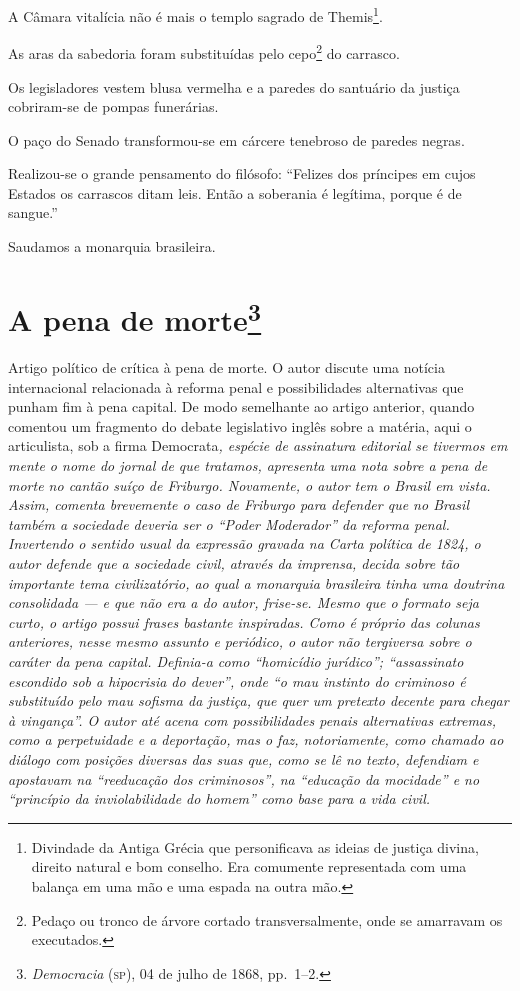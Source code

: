 A Câmara vitalícia não é mais o templo sagrado de Themis\footnote{
  Divindade da Antiga Grécia que personificava as ideias de justiça
  divina, direito natural e bom conselho. Era comumente representada com
  uma balança em uma mão e uma espada na outra mão.}.

As aras da sabedoria foram substituídas pelo cepo\footnote{Pedaço ou
  tronco de árvore cortado transversalmente, onde se amarravam os
  executados.} do carrasco.

Os legisladores vestem blusa vermelha e a paredes do santuário da
justiça cobriram-se de pompas funerárias.

O paço do Senado transformou-se em cárcere tenebroso de paredes negras.

Realizou-se o grande pensamento do filósofo: ``Felizes dos príncipes em
cujos Estados os carrascos ditam leis. Então a soberania é legítima,
porque é de sangue.''

Saudamos a monarquia brasileira.

\chapter{A pena de morte\footnote{\emph{Democracia} (\textsc{sp}), 04 de julho de 1868, pp.~1--2.}}

\begin{didascalia}
Artigo político de crítica à pena de morte. O autor discute uma notícia
internacional relacionada à reforma penal e possibilidades alternativas
que punham fim à pena capital. De modo semelhante ao artigo anterior,
quando comentou um fragmento do debate legislativo inglês sobre a
matéria, aqui o articulista, sob a firma Democrata\emph{, espécie de
assinatura editorial se tivermos em mente o nome do jornal de que
tratamos, apresenta uma nota sobre a pena de morte no cantão suíço de
Friburgo. Novamente, o autor tem o Brasil em vista. Assim, comenta
brevemente o caso de Friburgo para defender que no Brasil também a
sociedade deveria ser o ``Poder Moderador'' da reforma penal. Invertendo o
sentido usual da expressão gravada na Carta política de 1824, o autor
defende que a sociedade civil, através da imprensa, decida sobre tão
importante tema civilizatório, ao qual a monarquia brasileira tinha uma
doutrina consolidada --- e que não era a do autor, frise-se. Mesmo que o
formato seja curto, o artigo possui frases bastante inspiradas. Como é
próprio das colunas anteriores, nesse mesmo assunto e periódico, o autor
não tergiversa sobre o caráter da pena capital. Definia-a como
``homicídio jurídico''; ``assassinato escondido sob a hipocrisia do dever'',
onde ``o mau instinto do criminoso é substituído pelo mau sofisma da
justiça, que quer um pretexto decente para chegar à vingança''. O autor
até acena com possibilidades penais alternativas extremas, como a
perpetuidade e a deportação, mas o faz, notoriamente, como chamado ao
diálogo com posições diversas das suas que, como se lê no texto,
defendiam e apostavam na ``reeducação dos criminosos'', na ``educação da
mocidade'' e no ``princípio da inviolabilidade do homem'' como base para a
vida civil.}
\end{didascalia}



